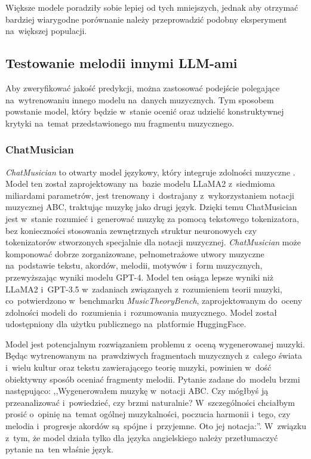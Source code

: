 \documentclass[data-science]{agh-wi} %
\begin{document}
Większe modele poradziły sobie lepiej od tych mniejszych, jednak aby otrzymać bardziej wiarygodne porównanie należy przeprowadzić podobny eksperyment na~większej populacji.

\subsection{Testowanie melodii innymi LLM-ami}
Aby zweryfikować jakość predykcji, można zastosować podejście polegające na~wytrenowaniu innego modelu na~danych muzycznych. Tym sposobem powstanie model, który będzie w~stanie ocenić oraz udzielić konstruktywnej krytyki na~temat przedstawionego mu fragmentu muzycznego.
\subsubsection*{ChatMusician}
\textit{ChatMusician} to otwarty model językowy, który integruje zdolności muzyczne \cite{yuan2024chatmusician}. Model ten został zaprojektowany na~bazie modelu LLaMA2 z~siedmioma miliardami parametrów, jest trenowany i~dostrajany z~wykorzystaniem notacji muzycznej ABC, traktując muzykę jako drugi język. Dzięki temu ChatMusician jest w~stanie rozumieć i~generować muzykę za pomocą tekstowego tokenizatora, bez konieczności stosowania zewnętrznych struktur neuronowych czy tokenizatorów stworzonych specjalnie dla notacji muzycznej. \textit{ChatMusician} może komponować dobrze zorganizowane, pełnometrażowe utwory muzyczne na~podstawie tekstu, akordów, melodii, motywów i~form muzycznych, przewyższając wyniki modelu GPT-4. Model ten osiąga lepsze wyniki niż LLaMA2 i~GPT-3.5 w~zadaniach związanych z~rozumieniem teorii muzyki, co~potwierdzono w~benchmarku \textit{MusicTheoryBench}, zaprojektowanym do~oceny zdolności modeli do~rozumienia i~rozumowania muzycznego. Model został udostępniony dla użytku publicznego na~platformie HuggingFace.

Model jest potencjalnym rozwiązaniem problemu z~oceną wygenerowanej muzyki. Będąc wytrenowanym na~prawdziwych fragmentach muzycznych z~całego świata i~wielu kultur oraz tekstu zawierającego teorię muzyki, powinien w~dość obiektywny sposób oceniać fragmenty melodii. Pytanie zadane do~modelu brzmi następująco: ,,Wygenerowałem muzykę w~notacji ABC. Czy mógłbyś ją przeanalizować i~powiedzieć, czy brzmi naturalnie? W~szczególności chciałbym prosić o~opinię na~temat ogólnej muzykalności, poczucia harmonii i~tego, czy melodia i~progresje akordów są~spójne i~przyjemne. Oto jej notacja:''. W~związku z~tym, że model działa tylko dla języka angielskiego należy przetłumaczyć pytanie na~ten właśnie język.
\end{document}
